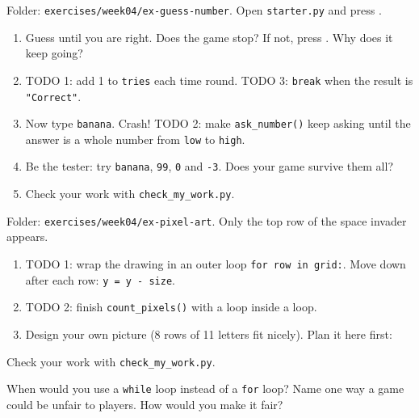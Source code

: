 \begin{exercise}
Folder: \texttt{exercises/week04/ex-guess-number}. Open \texttt{starter.py} and press .
\begin{enumerate}[leftmargin=1.4em]
  \item Guess until you are right. Does the game stop? If not, press . Why does it keep going?
  \item TODO 1: add 1 to \texttt{tries} each time round. TODO 3: \texttt{break} when the result is \texttt{"Correct"}.
  \item Now type \texttt{banana}. Crash! TODO 2: make \texttt{ask\_number()} keep asking until the answer is a whole number from \texttt{low} to \texttt{high}.
  \item Be the tester: try \texttt{banana}, \texttt{99}, \texttt{0} and \texttt{-3}. Does your game survive them all? \tickbox
  \item Check your work with \texttt{check\_my\_work.py}.
\end{enumerate}
\end{exercise}

\begin{exercise}
Folder: \texttt{exercises/week04/ex-pixel-art}. Only the top row of the space invader appears.
\begin{enumerate}[leftmargin=1.4em]
  \item TODO 1: wrap the drawing in an outer loop \texttt{for row in grid:}. Move down after each row: \texttt{y = y - size}.
  \item TODO 2: finish \texttt{count\_pixels()} with a loop inside a loop.
  \item Design your own picture (8 rows of 11 letters fit nicely). Plan it here first:
\end{enumerate}
\begin{center}
\end{center}
Check your work with \texttt{check\_my\_work.py}.
\end{exercise}

\begin{vocab}
\end{vocab}

\begin{reflection}
When would you use a \texttt{while} loop instead of a \texttt{for} loop?
Name one way a game could be unfair to players. How would you make it fair?
\end{reflection}
